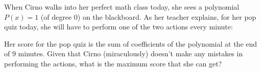 When Cirno walks into her perfect math class today, she sees a polynomial $P(x)=1$ (of degree 0) on the blackboard. As her teacher explains, for her pop quiz today, she will have to perform one of the two actions every minute:

\begin{itemize}


\end{itemize}

Her score for the pop quiz is the sum of coefficients of the polynomial at the end of 9 minutes. Given that Cirno (miraculously) doesn't make any mistakes in performing the actions, what is the maximum score that she can get?

